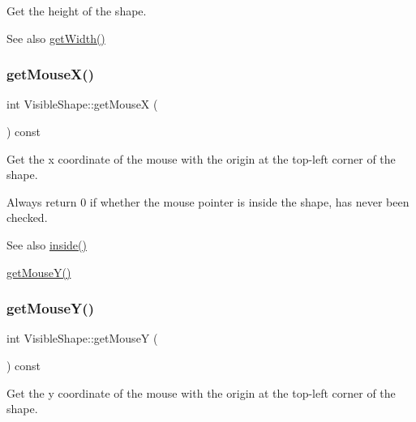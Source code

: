 Get the height of the shape. 

\begin{DoxySeeAlso}{See also}
\mbox{\hyperlink{class_visible_shape_a667b81608efd869c907bd342397f3eb5}{get\+Width()}} 
\end{DoxySeeAlso}
\mbox{\label{class_visible_shape_a53dd71f6cee05f9707d899c4e1434070}} 
\subsubsection{\texorpdfstring{get\+Mouse\+X()}{getMouseX()}}
{\footnotesize\ttfamily int Visible\+Shape\+::get\+MouseX (\begin{DoxyParamCaption}{ }\end{DoxyParamCaption}) const\hspace{0.3cm}{\ttfamily [virtual]}}



Get the x coordinate of the mouse with the origin at the top-\/left corner of the shape. 

Always return 0 if whether the mouse pointer is inside the shape, has never been checked. \begin{DoxySeeAlso}{See also}
\mbox{\hyperlink{class_visible_shape_aab5199578030849314f0c6a339aa4281}{inside()}} 

\mbox{\hyperlink{class_visible_shape_a6b0536f0437e514ba1bda6927becb603}{get\+Mouse\+Y()}} 
\end{DoxySeeAlso}
\mbox{\label{class_visible_shape_a6b0536f0437e514ba1bda6927becb603}} 
\subsubsection{\texorpdfstring{get\+Mouse\+Y()}{getMouseY()}}
{\footnotesize\ttfamily int Visible\+Shape\+::get\+MouseY (\begin{DoxyParamCaption}{ }\end{DoxyParamCaption}) const\hspace{0.3cm}{\ttfamily [virtual]}}



Get the y coordinate of the mouse with the origin at the top-\/left corner of the shape. 


